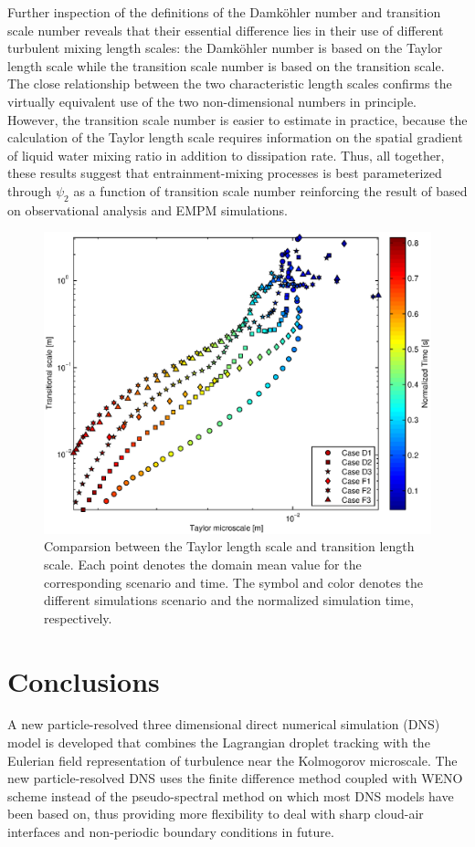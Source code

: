 \documentclass[draft,linenumbers]{AGUJournal}
\begin{document}
Further inspection of the definitions of the Damk\"ohler number and transition scale number reveals that their essential difference lies in their use of different turbulent mixing length scales: the Damk\"ohler number is based on the Taylor length scale while the transition scale number is based on the transition scale. The close relationship between the two characteristic length scales  confirms the virtually equivalent use of the two non-dimensional numbers in principle. However, the transition scale number is easier to estimate in practice, because the calculation of the Taylor length scale requires information on the spatial gradient of liquid water mixing ratio in addition to dissipation rate. Thus, all together, these results suggest that entrainment-mixing processes is best parameterized through $\psi_2$ as a function of transition scale number reinforcing the result of  \citet{Lu2013} based on observational analysis and EMPM simulations.     
\begin{figure}\centering
\includegraphics[width=0.5\linewidth]{Figures/taylor_trans}
\caption{Comparsion between the Taylor length scale and transition length scale. Each point denotes the domain mean value for the corresponding scenario and time. The symbol and color denotes the different simulations scenario and the normalized simulation time, respectively. \label{fig:TaylorScaleTranScale}}
\end{figure}

\section{Conclusions}\label{conclusion}
A new particle-resolved three dimensional direct numerical simulation (DNS) model is developed that combines the Lagrangian droplet tracking with the Eulerian field representation of turbulence near the Kolmogorov microscale. The new particle-resolved DNS uses the finite difference method coupled with WENO  scheme instead of the pseudo-spectral method on which most DNS models have been based on, thus providing more flexibility to deal with sharp cloud-air interfaces and non-periodic boundary conditions in future.
\end{document}
